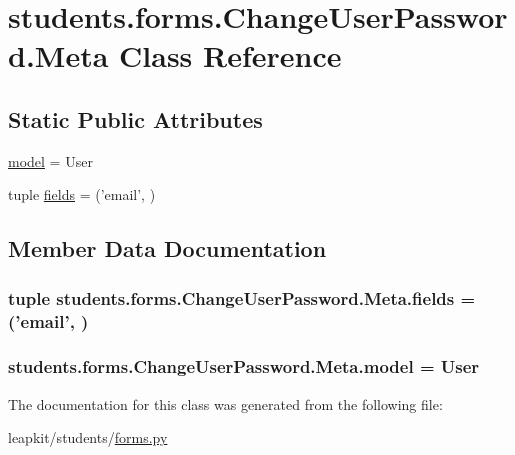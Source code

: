 \hypertarget{classstudents_1_1forms_1_1_change_user_password_1_1_meta}{\section{students.\-forms.\-Change\-User\-Password.\-Meta Class Reference}
\label{classstudents_1_1forms_1_1_change_user_password_1_1_meta}
}
\subsection*{Static Public Attributes}
\begin{DoxyCompactItemize}
\item 
\hyperlink{classstudents_1_1forms_1_1_change_user_password_1_1_meta_adf064a85f98652b04ad28a1ab8163e21}{model} = User
\item 
tuple \hyperlink{classstudents_1_1forms_1_1_change_user_password_1_1_meta_afa682e096ea9804e30f44b9e6bd69060}{fields} = ('email', )
\end{DoxyCompactItemize}


\subsection{Member Data Documentation}
\hypertarget{classstudents_1_1forms_1_1_change_user_password_1_1_meta_afa682e096ea9804e30f44b9e6bd69060}{
\subsubsection[{fields}]{\setlength{\rightskip}{0pt plus 5cm}tuple students.\-forms.\-Change\-User\-Password.\-Meta.\-fields = ('email', )\hspace{0.3cm}{\ttfamily [static]}}}\label{classstudents_1_1forms_1_1_change_user_password_1_1_meta_afa682e096ea9804e30f44b9e6bd69060}
\hypertarget{classstudents_1_1forms_1_1_change_user_password_1_1_meta_adf064a85f98652b04ad28a1ab8163e21}{
\subsubsection[{model}]{\setlength{\rightskip}{0pt plus 5cm}students.\-forms.\-Change\-User\-Password.\-Meta.\-model = User\hspace{0.3cm}{\ttfamily [static]}}}\label{classstudents_1_1forms_1_1_change_user_password_1_1_meta_adf064a85f98652b04ad28a1ab8163e21}


The documentation for this class was generated from the following file\-:\begin{DoxyCompactItemize}
\item 
leapkit/students/\hyperlink{forms_8py}{forms.\-py}\end{DoxyCompactItemize}
